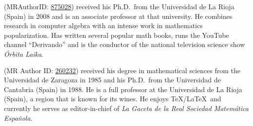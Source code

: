 \documentclass[a4paper]{article}
\begin{document}
\begin{biog}
\item[Eduardo S\'aenz de Cabez\'on] 
(MRAuthorID: \href{http://www.ams.org/mathscinet/MRAuthorID/875028}{875028}) 
received his Ph.D.\ from the Universidad de La Rioja (Spain) in 2008 and is an associate professor at that university. He combines research in computer algebra with an intense work in mathematics popularization. Has written several popular math books, runs the YouTube channel ``Derivando'' and is the conductor of the national television science show \textit{\'Orbita Laika}.
\item[Juan Luis Varona] 
(MR Author ID: \href{http://www.ams.org/mathscinet/MRAuthorID/260232}{260232}) 
received his degree in mathematical sciences from the Universidad de Zaragoza in 1985 and his Ph.D.\ from the Universidad de Cantabria (Spain) in 1988. He is a full professor at the Universidad de La Rioja (Spain), a region that is known for its wines. He enjoys \TeX/\LaTeX\ and currently he serves as editor-in-chief of \textit{La Gaceta de la Real Sociedad Matem\'atica Espa\~nola}.
\end{biog}
\end{document}
